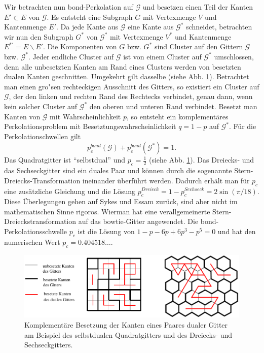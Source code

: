 Wir betrachten nun bond-Perkolation auf $\mathcal{G}$ und besetzen einen Teil der Kanten $E'\subset E$ von $\mathcal{G}$. Es entsteht eine Subgraph $G$ mit Vertexmenge $V$ und Kantenmenge $E'$. Da jede Kante aus $\mathcal{G}$ eine Kante aus $\mathcal{G}^*$ schneidet, betrachten wir nun den Subgraph $G^*$ von $\mathcal{G}^*$ mit Vertexmenge $V^*$ und Kantenmenge $E^{*'}=E\backslash E'$. Die Komponenten von $G$ bzw. $G^*$ sind Cluster auf den Gittern $\mathcal{G}$ bzw. $\mathcal{G}^*$. Jeder endliche Cluster auf $\mathcal{G}$ ist von einem Cluster auf $\mathcal{G}^*$ umschlossen, denn alle unbesetzten Kanten am Rand eines Clusters werden von besetzten dualen Kanten geschnitten. Umgekehrt gilt dasselbe (siehe Abb. \ref{fig:dual}). Betrachtet man einen gro"sen rechteckigen Ausschnitt des Gitters, so existiert ein Cluster auf $\mathcal{G}$, der den linken und rechten Rand des Rechtecks verbindet, genau dann, wenn kein solcher Cluster auf $\mathcal{G}^*$ den oberen und unteren Rand verbindet. Besetzt man Kanten von $\mathcal{G}$ mit Wahrscheinlichkeit $p$, so entsteht ein komplement\"ares Perkolationsproblem mit Besetztungswahrscheinlichkeit $q=1-p$ auf $\mathcal{G}^*$. F\"ur die Perkolationschwellen gilt 
\begin{equation}
  p_c^{bond}(\mathcal{G})+p_c^{bond}(\mathcal{G}^*)=1.
\end{equation}
Das Quadratgitter ist ``selbstdual'' und $p_c=\frac{1}{2}$ (siehe Abb. \ref{fig:dual}). Das Dreiecks- und das Sechseckgitter sind ein duales Paar und k\"onnen durch die sogenannte Stern-Dreiecks-Transformation ineinander \"uberf\"uhrt werden. Dadurch erh\"alt man f\"ur $p_c$ eine zus\"atzliche Gleichung und die L\"osung $p_c^{Dreieck}=1-p_c^{Sechseck}=2\sin(\pi/18)$. Diese \"Uberlegungen gehen auf Sykes und Essam \cite{Sykes:64} zur\"uck, sind aber nicht im mathematischen Sinne rigoros. Wierman \cite{Wierman:84} hat eine verallgemeinerte Stern-Dreieckstransformation auf das bowtie-Gitter angewendet. Die bond-Perkolationsschwelle $p_c$ ist die L\"osung von $1-p-6p+6p^3-p^5=0$ und hat den numerischen Wert $p_c=0.404518\ldots$.
\begin{figure}[htbp]
  \centering
  \includegraphics{./Einleitung-figs/dualnew}
  \caption{Komplement\"are Besetzung der Kanten eines Paares dualer Gitter am Beispiel des selbstdualen Quadratgitters und des Dreiecks- und Sechseckgitters.}
  \label{fig:dual}
\end{figure}
